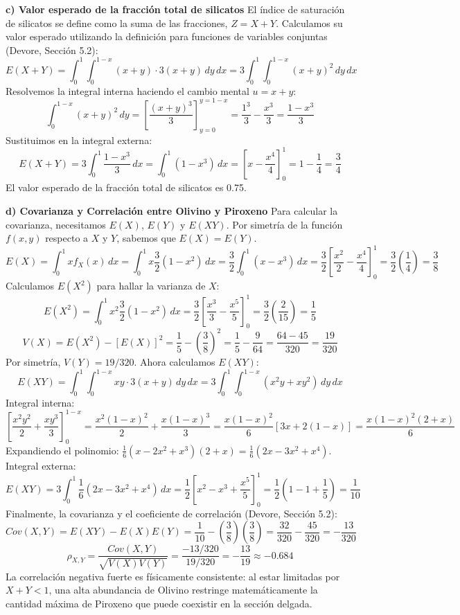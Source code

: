 \textbf{c) Valor esperado de la fracción total de silicatos}
El índice de saturación de silicatos se define como la suma de las fracciones, $Z = X + Y$. Calculamos su valor esperado utilizando la definición para funciones de variables conjuntas (Devore, Sección 5.2):
$$ E(X + Y) = \int_{0}^{1} \int_{0}^{1-x} (x + y) \cdot 3(x + y) \, dy \, dx = 3 \int_{0}^{1} \int_{0}^{1-x} (x + y)^2 \, dy \, dx $$
Resolvemos la integral interna haciendo el cambio mental $u = x+y$:
$$ \int_{0}^{1-x} (x + y)^2 \, dy = \left[ \frac{(x+y)^3}{3} \right]_{y=0}^{y=1-x} = \frac{1^3}{3} - \frac{x^3}{3} = \frac{1 - x^3}{3} $$
Sustituimos en la integral externa:
$$ E(X + Y) = 3 \int_{0}^{1} \frac{1 - x^3}{3} \, dx = \int_{0}^{1} (1 - x^3) \, dx = \left[ x - \frac{x^4}{4} \right]_{0}^{1} = 1 - \frac{1}{4} = \frac{3}{4} $$
El valor esperado de la fracción total de silicatos es 0.75.

\textbf{d) Covarianza y Correlación entre Olivino y Piroxeno}
Para calcular la covarianza, necesitamos $E(X)$, $E(Y)$ y $E(XY)$. Por simetría de la función $f(x,y)$ respecto a $X$ y $Y$, sabemos que $E(X) = E(Y)$.
$$ E(X) = \int_{0}^{1} x f_X(x) \, dx = \int_{0}^{1} x \frac{3}{2}(1 - x^2) \, dx = \frac{3}{2} \int_{0}^{1} (x - x^3) \, dx = \frac{3}{2} \left[ \frac{x^2}{2} - \frac{x^4}{4} \right]_{0}^{1} = \frac{3}{2} \left( \frac{1}{4} \right) = \frac{3}{8} $$
Calculamos $E(X^2)$ para hallar la varianza de $X$:
$$ E(X^2) = \int_{0}^{1} x^2 \frac{3}{2}(1 - x^2) \, dx = \frac{3}{2} \left[ \frac{x^3}{3} - \frac{x^5}{5} \right]_{0}^{1} = \frac{3}{2} \left( \frac{2}{15} \right) = \frac{1}{5} $$
$$ V(X) = E(X^2) - [E(X)]^2 = \frac{1}{5} - \left(\frac{3}{8}\right)^2 = \frac{1}{5} - \frac{9}{64} = \frac{64 - 45}{320} = \frac{19}{320} $$
Por simetría, $V(Y) = 19/320$. Ahora calculamos $E(XY)$:
$$ E(XY) = \int_{0}^{1} \int_{0}^{1-x} xy \cdot 3(x + y) \, dy \, dx = 3 \int_{0}^{1} \int_{0}^{1-x} (x^2y + xy^2) \, dy \, dx $$
Integral interna:
$$ \left[ \frac{x^2y^2}{2} + \frac{xy^3}{3} \right]_{0}^{1-x} = \frac{x^2(1-x)^2}{2} + \frac{x(1-x)^3}{3} = \frac{x(1-x)^2}{6} [3x + 2(1-x)] = \frac{x(1-x)^2(2+x)}{6} $$
Expandiendo el polinomio: $\frac{1}{6}(x - 2x^2 + x^3)(2+x) = \frac{1}{6}(2x - 3x^2 + x^4)$.
Integral externa:
$$ E(XY) = 3 \int_{0}^{1} \frac{1}{6}(2x - 3x^2 + x^4) \, dx = \frac{1}{2} \left[ x^2 - x^3 + \frac{x^5}{5} \right]_{0}^{1} = \frac{1}{2} \left( 1 - 1 + \frac{1}{5} \right) = \frac{1}{10} $$
Finalmente, la covarianza y el coeficiente de correlación (Devore, Sección 5.2):
$$ Cov(X,Y) = E(XY) - E(X)E(Y) = \frac{1}{10} - \left(\frac{3}{8}\right)\left(\frac{3}{8}\right) = \frac{32}{320} - \frac{45}{320} = -\frac{13}{320} $$
$$ \rho_{X,Y} = \frac{Cov(X,Y)}{\sqrt{V(X)V(Y)}} = \frac{-13/320}{19/320} = -\frac{13}{19} \approx -0.684 $$
La correlación negativa fuerte es físicamente consistente: al estar limitadas por $X+Y < 1$, una alta abundancia de Olivino restringe matemáticamente la cantidad máxima de Piroxeno que puede coexistir en la sección delgada.

